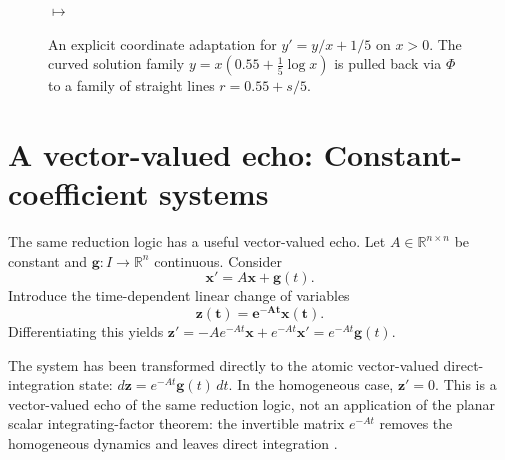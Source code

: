 \documentclass[11pt]{article}
\theoremstyle{definition}
\begin{document}
\begin{figure}[ht]
\centering
\begin{minipage}{0.46\textwidth}
\centering
{}
\end{minipage}
\hfill
{\Large\(\longmapsto\)}
\hfill
\begin{minipage}{0.46\textwidth}
\centering
{}
\end{minipage}
\caption{An explicit coordinate adaptation for \(y'=y/x+1/5\) on \(x>0\). The curved solution family \(y=x(0.55+\tfrac15\log x)\) is pulled back via \(\Phi\) to a family of straight lines \(r=0.55+s/5\).}
\label{fig:lie}
\end{figure}
\FloatBarrier

\section{A vector-valued echo: Constant-coefficient systems}

The same reduction logic has a useful vector-valued echo. Let \(A\in\mathbb R^{n\times n}\) be constant and \(\mathbf g:I\to\mathbb R^n\) continuous. Consider
\[
\mathbf{x}'=A\mathbf{x}+\mathbf{g}(t).
\]
Introduce the time-dependent linear change of variables
\[
\boldsymbol{\mathbf{z}(t)=e^{-At}\mathbf{x}(t).}
\]
Differentiating this yields \(\mathbf{z}' = -Ae^{-At}\mathbf{x}+e^{-At}\mathbf{x}' = e^{-At}\mathbf{g}(t)\). 

The system has been transformed directly to the atomic vector-valued direct-integration state: \(d\mathbf{z}=e^{-At}\mathbf{g}(t)\,dt\). In the homogeneous case, \(\mathbf{z}'=0\). This is a vector-valued echo of the same reduction logic, not an application of the planar scalar integrating-factor theorem: the invertible matrix \(e^{-At}\) removes the homogeneous dynamics and leaves direct integration \cite{Boyce2017,Teschl2012}.
\end{document}
